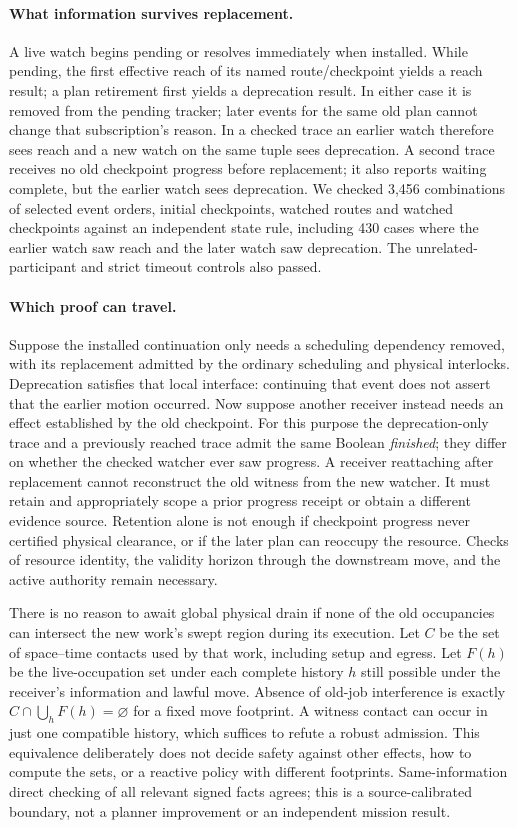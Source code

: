 \documentclass{article}
\begin{document}
\paragraph{What information survives replacement.}
A live watch begins pending or resolves immediately when installed. While pending, the first effective reach of its named route/checkpoint yields a reach result; a plan retirement first yields a deprecation result. In either case it is removed from the pending tracker; later events for the same old plan cannot change that subscription's reason. In a checked trace an earlier watch therefore sees reach and a new watch on the same tuple sees deprecation. A second trace receives no old checkpoint progress before replacement; it also reports waiting complete, but the earlier watch sees deprecation. We checked 3,456 combinations of selected event orders, initial checkpoints, watched routes and watched checkpoints against an independent state rule, including 430 cases where the earlier watch saw reach and the later watch saw deprecation. The unrelated-participant and strict timeout controls also passed.

\paragraph{Which proof can travel.}
Suppose the installed continuation only needs a scheduling dependency removed, with its replacement admitted by the ordinary scheduling and physical interlocks. Deprecation satisfies that local interface: continuing that event does not assert that the earlier motion occurred. Now suppose another receiver instead needs an effect established by the old checkpoint. For this purpose the deprecation-only trace and a previously reached trace admit the same Boolean \emph{finished}; they differ on whether the checked watcher ever saw progress. A receiver reattaching after replacement cannot reconstruct the old witness from the new watcher. It must retain and appropriately scope a prior progress receipt or obtain a different evidence source. Retention alone is not enough if checkpoint progress never certified physical clearance, or if the later plan can reoccupy the resource. Checks of resource identity, the validity horizon through the downstream move, and the active authority remain necessary.

There is no reason to await global physical drain if none of the old occupancies can intersect the new work's swept region during its execution. Let \(C\) be the set of space--time contacts used by that work, including setup and egress. Let \(F(h)\) be the live-occupation set under each complete history \(h\) still possible under the receiver's information and lawful move. Absence of old-job interference is exactly \(C\cap\bigcup_h F(h)=\varnothing\) for a fixed move footprint. A witness contact can occur in just one compatible history, which suffices to refute a robust admission. This equivalence deliberately does not decide safety against other effects, how to compute the sets, or a reactive policy with different footprints. Same-information direct checking of all relevant signed facts agrees; this is a source-calibrated boundary, not a planner improvement or an independent mission result.
\end{document}
